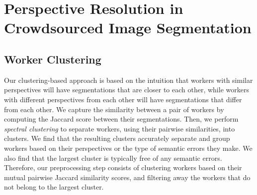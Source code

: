 \section{Perspective Resolution in Crowdsourced Image Segmentation}
\subsection{Worker Clustering}
Our clustering-based approach is based on the intuition that workers with similar perspectives  will have segmentations that are closer to each other, while workers with different perspectives from each other will have segmentations that differ from each other. We capture the similarity between a pair of workers by computing the Jaccard score between their segmentations. Then, we perform {\em spectral clustering} to separate workers, using their pairwise similarities, into clusters. We find that the resulting clusters accurately separate and group workers based on their perspectives or the type of semantic errors they make. We also find that the largest cluster is typically free of any semantic errors. Therefore, our preprocessing step consists of clustering workers based on their mutual pairwise Jaccard similarity scores, and filtering away the workers that do not belong to the largest cluster. 

